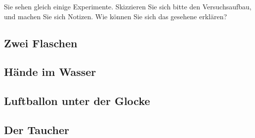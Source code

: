 \begin{aufgabe}
Sie sehen gleich einige Experimente.
Skizzieren Sie sich bitte den Versuchsaufbau, und machen Sie sich Notizen.
Wie können Sie sich das gesehene erklären?
	

\subsection*{Zwei Flaschen}


\subsection*{Hände im Wasser}


\subsection*{Luftballon unter der Glocke}

\subsection*{Der Taucher}

\end{aufgabe}

